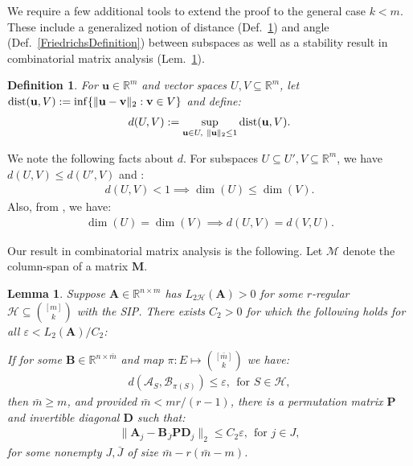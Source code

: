 \documentclass[9pt,twocolumn]{pnas-new}
\newtheorem{lemma}{Lemma}
\newtheorem{definition}{Definition}
\begin{document}
We require a few additional tools to extend the proof to the general case $k < m$. These include a generalized notion of distance (Def.~\ref{dDef}) and angle (Def.~\ref{FriedrichsDefinition}) between subspaces as well as a stability result in combinatorial matrix analysis (Lem.~\ref{MainLemma}).

\begin{definition}\label{dDef}
For $\mathbf{u} \in \mathbb R^m$ and vector spaces $U,V \subseteq \mathbb{R}^m$, let $\text{\rm dist}(\mathbf{u}, V) := \inf \{\| \mathbf{u}-\mathbf{v} \|_2: \mathbf{v} \in V\}$ and define:
\begin{align}
d(U,V) := \sup_{\mathbf{u} \in U, \ \|\mathbf{u}\|_2 \leq 1} \text{\rm dist}(\mathbf{u},V).
\end{align}
\end{definition}

We note the following facts about $d$. For subspaces $U \subseteq U', V \subseteq \mathbb{R}^m$, we have $d(U,V) \leq d(U',V)$ and \cite[Cor.~2.6]{Kato2013}:
\begin{align}\label{dimLem}
d(U,V) < 1 \implies \dim(U) \leq \dim(V).
\end{align}
Also, from \cite[Lem.~3.2]{Morris10}, we have:
\begin{align}\label{eqdim}
\dim(U) = \dim(V) \implies d(U,V) = d(V,U).
\end{align}

Our result in combinatorial matrix analysis is the following. Let $\bm{\mathcal{M}}$ denote the column-span of a matrix $\mathbf{M}$.

\begin{lemma}\label{MainLemma}
Suppose $\mathbf{A} \in \mathbb{R}^{n \times m}$ has $L_{2\mathcal{H}}(\mathbf{A}) > 0$ for some $r$-regular $\mathcal{H} \subseteq {[m] \choose k}$ with the SIP. There exists $C_2 > 0$ for which the following holds for all $\varepsilon < L_2(\mathbf{A}) / C_2$:

If for some  $\mathbf{B} \in \mathbb{R}^{n \times \bar m}$ and map $\pi: E \mapsto {[\bar m] \choose k}$ we have:
\begin{align}\label{GapUpperBound}
d(\bm{\mathcal{A}}_S, \bm{\mathcal{B}}_{\pi(S)}) \leq \varepsilon, \ \  \text{for $S \in \mathcal{H}$},
\end{align}
then $\bar m \geq m$, and provided $\bar m < mr /(r-1)$, there is a permutation matrix $\mathbf{P}$ and invertible diagonal $\mathbf{D}$ such that:
\begin{align}\label{MainLemmaBPD}
\|\mathbf{A}_j - \mathbf{B}_{\bar J} \mathbf{PD}_j\|_2 \leq C_2 \varepsilon, \ \  \text{for } j \in J,
\end{align}
for some nonempty $J, \bar J$ of size $\bar m - r(\bar m - m)$.
\end{lemma}
\end{document}
